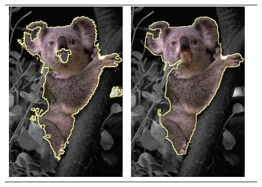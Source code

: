 \documentclass[runningheads]{llncs}
\begin{document}
\begin{figure}
\begin{tabular}{ccc}
 	\includegraphics[scale=0.25]{images/segmentation/bc/coala/lg0_sq0_dt1_it20.png} & 
	\includegraphics[scale=0.25]{images/segmentation/bc/coala/r3/lg1_sq0_dt1_it50.png} &

\end{tabular}
\end{figure}
\end{document}
